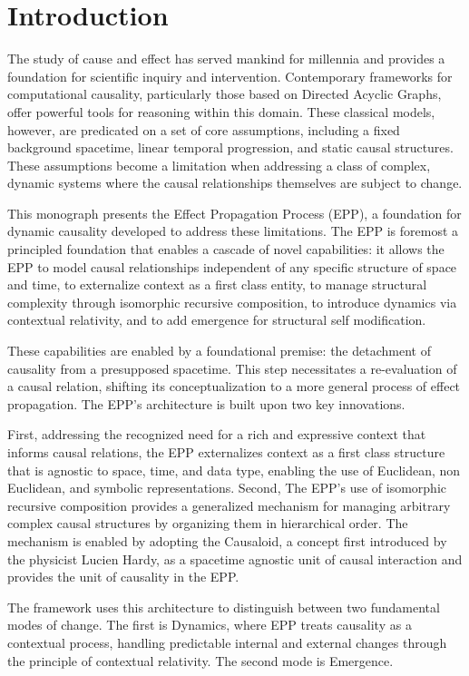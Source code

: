 \section{Introduction}
\label{sec:introduction}

The study of cause and effect has served mankind for millennia and provides a foundation for scientific inquiry and intervention. 
Contemporary frameworks for computational causality, particularly those based on Directed Acyclic Graphs, offer powerful tools for reasoning within this domain. 
These classical models, however, are predicated on a set of core assumptions, including a fixed background spacetime, linear temporal progression, 
and static causal structures. These assumptions become a limitation when addressing a class of complex, 
dynamic systems where the causal relationships themselves are subject to change.

This monograph presents the Effect Propagation Process (EPP), a foundation for dynamic causality developed to address these limitations. 
The EPP is foremost a principled foundation that enables a cascade of novel capabilities: it allows the EPP to model causal relationships 
independent of any specific structure of space and time, to externalize context as a first class entity, to manage structural complexity through isomorphic recursive composition, 
to introduce dynamics via contextual relativity, and to add emergence for structural self modification.

These capabilities are enabled by a foundational premise: the detachment of causality from a presupposed spacetime. This step necessitates a re-evaluation of a causal relation, shifting its conceptualization to a more general process of effect propagation. The EPP's architecture is built upon two key innovations. 

First, addressing the recognized need for a rich and expressive context that informs causal relations, the EPP externalizes context as a first class structure that is agnostic to space, time, and data type, enabling the use of Euclidean, non Euclidean, and symbolic representations. 
Second, The EPP's use of isomorphic recursive composition provides a generalized mechanism for managing arbitrary complex causal structures by
organizing them in hierarchical order. The mechanism is enabled by adopting the Causaloid, a concept first introduced by the physicist Lucien Hardy, 
as a spacetime agnostic unit of causal interaction and provides the unit of causality in the EPP.

The framework uses this architecture to distinguish between two fundamental modes of change. 
The first is Dynamics, where EPP treats causality as a contextual process, handling predictable internal and external changes through the principle of contextual relativity. 
The second mode is Emergence.

